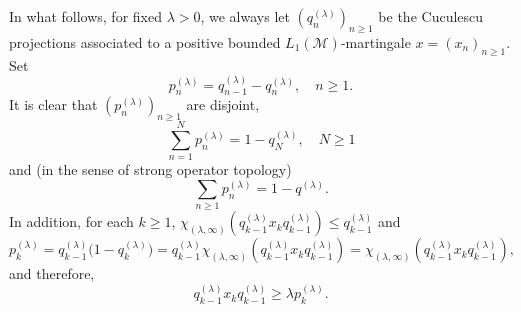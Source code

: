 \documentclass[11]{amsart}
\numberwithin{equation}{section}
\newtheorem{lemma}[theorem]{Lemma}
\begin{document}
In what follows, for fixed $\lambda>0$, we always let $(q_n^{(\lambda)})_{n\geq 1}$ be the Cuculescu projections associated to a positive bounded $L_1(\mathcal{M})$-martingale $x=(x_n)_{n\geq1}$.  Set
\begin{equation}\label{pn}
	p_n^{(\lambda)} = q_{n-1}^{(\lambda)}-q_n^{(\lambda)}, \quad n\geq 1.
\end{equation}
It is clear that $(	p_n^{(\lambda)})_{n\geq1}$ are disjoint, 
\begin{equation}\label{pN}
	\sum_{n=1}^N p_n^{(\lambda)}=1-q_N^{(\lambda)},\quad N\geq1
\end{equation}
and (in the sense of strong operator topology)
\begin{equation}\label{sump}
	\sum_{n\geq1} p_n^{(\lambda)}=1-q^{(\lambda)}.
\end{equation}
In addition, for each $k\geq1$, $\chi_{(\lambda,\infty)}(q_{k-1}^{(\lambda)}x_kq_{k-1}^{(\lambda)})\leq q_{k-1}^{(\lambda)}$ and
\begin{equation}
	p_k^{(\lambda)}=q_{k-1}^{(\lambda)}\big(1-q_k^{(\lambda)}\big)=q_{k-1}^{(\lambda)} \chi_{(\lambda,\infty)}(q_{k-1}^{(\lambda)}x_kq_{k-1}^{(\lambda)})=\chi_{(\lambda,\infty)}(q_{k-1}^{(\lambda)}x_kq_{k-1}^{(\lambda)}),
\end{equation}
and therefore, 
\begin{equation}\label{qxq geq p}
q_{k-1}^{(\lambda)}x_kq_{k-1}^{(\lambda)}\geq \lambda 	p_k^{(\lambda)}.
\end{equation}



%
%
%
%
\end{document}
